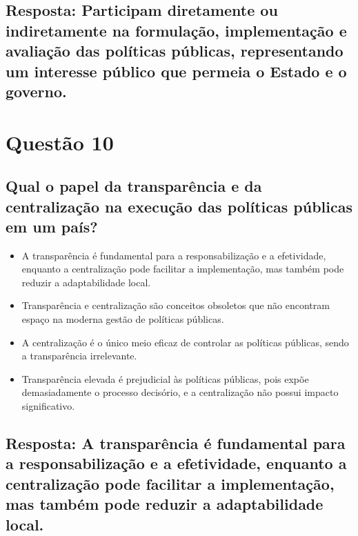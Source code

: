 \documentclass[
   article,       
   12pt,          
   oneside,       
   a4paper,       
   english,       
   brazil,        
   sumario=tradicional
   ]{abntex2}
\begin{document}
\subsection{Resposta: Participam diretamente ou indiretamente na formulação, implementação e avaliação das políticas públicas, representando um interesse público que permeia o Estado e o governo.}

\section{Questão 10}
\subsection{Qual o papel da transparência e da centralização na execução das políticas públicas em um país?}
\begin{itemize}
    \item A transparência é fundamental para a responsabilização e a efetividade, enquanto a centralização pode facilitar a implementação, mas também pode reduzir a adaptabilidade local.
    \item Transparência e centralização são conceitos obsoletos que não encontram espaço na moderna gestão de políticas públicas.
    \item A centralização é o único meio eficaz de controlar as políticas públicas, sendo a transparência irrelevante.
    \item Transparência elevada é prejudicial às políticas públicas, pois expõe demasiadamente o processo decisório, e a centralização não possui impacto significativo.
\end{itemize}
\subsection{Resposta: A transparência é fundamental para a responsabilização e a efetividade, enquanto a centralização pode facilitar a implementação, mas também pode reduzir a adaptabilidade local.}
\postextual

\end{document}
